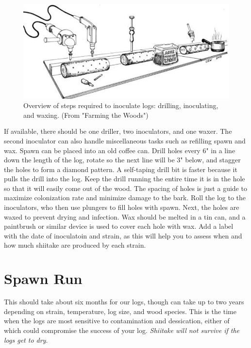 \documentclass{tufte-handout}
\begin{document}
\begin{figure}
\includegraphics{figures/innoculation-workflow}
\caption{Overview of steps required to inoculate logs: drilling, inoculating, and waxing. (From "Farming the Woods")}
\end{figure}

If available, there should be one driller, two inoculators, and one waxer.
The second inoculator can also handle miscellaneous tasks such as refilling spawn and wax.
Spawn can be placed into an old coffee can. 
Drill holes every 6" in a line down the length of the log, rotate so the next line will be 3" below, and stagger the holes to form a diamond pattern. 
A self-taping drill bit is faster because it pulls the drill into the log.
Keep the drill running the entire time it is in the hole so that it will easily come out of the wood. 
The spacing of holes is just a guide to maximize colonization rate
and minimize damage to the bark. 
Roll the log to the inoculators, who then use plungers to fill holes with spawn.
Next, the holes are waxed to prevent
drying and infection. 
Wax should be melted in a tin can, and a paintbrush or similar device is used to cover each hole with wax.
Add a label with the date of inoculatoin and strain, as this will help you to assess
when and how much shiitake are produced
by each strain.

\section{Spawn Run}

 This should take about six months for our logs, though can take up to two years depending on strain, temperature, log size, and wood species.
This is the time when the logs are most sensitive to contamination and dessication, either of which could compromise the success of your log.
\emph{Shiitake will not survive if the logs get to dry}.
\end{document}
